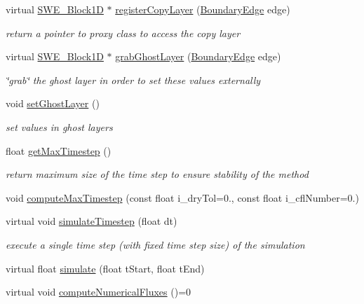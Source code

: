 \begin{DoxyCompactItemize}
virtual \hyperlink{structSWE__Block1D}{S\-W\-E\-\_\-\-Block1\-D} $\ast$ \hyperlink{classSWE__Block_a827ee5c61dc9c1b472ac8b4e1c19956a}{register\-Copy\-Layer} (\hyperlink{SWE__Scenario_8hh_aa5e01e3f7df312f7b9b0d02521141fcc}{Boundary\-Edge} edge)
\begin{DoxyCompactList}\small\item\em return a pointer to proxy class to access the copy layer \end{DoxyCompactList}\item 
virtual \hyperlink{structSWE__Block1D}{S\-W\-E\-\_\-\-Block1\-D} $\ast$ \hyperlink{classSWE__Block_a9a96c59444645e237d098803009158a3}{grab\-Ghost\-Layer} (\hyperlink{SWE__Scenario_8hh_aa5e01e3f7df312f7b9b0d02521141fcc}{Boundary\-Edge} edge)
\begin{DoxyCompactList}\small\item\em \char`\"{}grab\char`\"{} the ghost layer in order to set these values externally \end{DoxyCompactList}\item 
void \hyperlink{classSWE__Block_afd17334abee3145e27cc3c9b7b935da2}{set\-Ghost\-Layer} ()
\begin{DoxyCompactList}\small\item\em set values in ghost layers \end{DoxyCompactList}\item 
float \hyperlink{classSWE__Block_a74da1eb712e639e47b5b848081b2afad}{get\-Max\-Timestep} ()
\begin{DoxyCompactList}\small\item\em return maximum size of the time step to ensure stability of the method \end{DoxyCompactList}\item 
void \hyperlink{classSWE__Block_acf2ff6617cbc0d3d837f0e618039cfe2}{compute\-Max\-Timestep} (const float i\-\_\-dry\-Tol=0., const float i\-\_\-cfl\-Number=0.)
\item 
virtual void \hyperlink{classSWE__Block_add6908e1ceb261a0a1f3ebc262cc5f11}{simulate\-Timestep} (float dt)
\begin{DoxyCompactList}\small\item\em execute a single time step (with fixed time step size) of the simulation \end{DoxyCompactList}\item 
virtual float \hyperlink{classSWE__Block_a69784e2be2d09035fb2af9d306768f07}{simulate} (float t\-Start, float t\-End)
\item 
virtual void \hyperlink{classSWE__Block_a94dcf2c6ae31731e4586e45628b0c00e}{compute\-Numerical\-Fluxes} ()=0

\end{DoxyCompactItemize}
